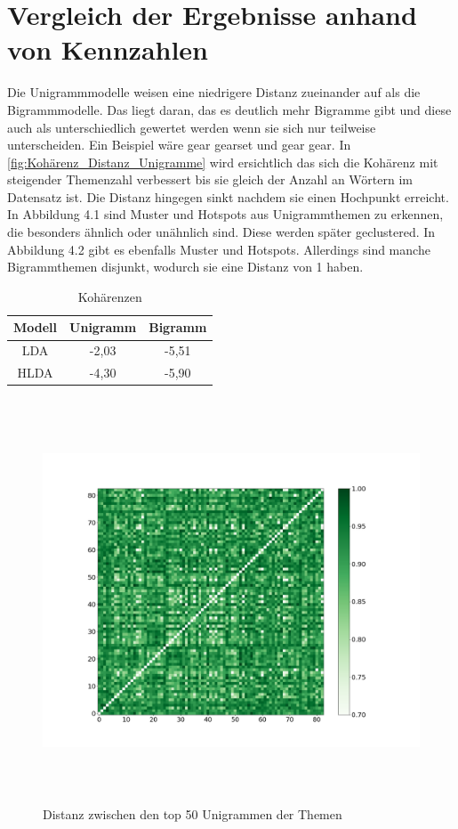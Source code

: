 \section{Vergleich der Ergebnisse anhand von Kennzahlen}
Die Unigrammmodelle weisen eine niedrigere Distanz zueinander auf als die Bigrammmodelle. Das liegt daran, das es deutlich mehr Bigramme gibt und diese auch als unterschiedlich gewertet werden wenn sie sich nur teilweise unterscheiden. Ein Beispiel wäre gear gearset und gear gear. In \ref{fig:Kohärenz_Distanz_Unigramme} wird ersichtlich das sich die Kohärenz mit steigender Themenzahl verbessert bis sie gleich der Anzahl an Wörtern im Datensatz ist. Die Distanz hingegen sinkt nachdem sie einen Hochpunkt erreicht. In Abbildung 4.1 sind Muster und Hotspots aus Unigrammthemen zu erkennen, die besonders ähnlich oder unähnlich sind. Diese werden später geclustered. In Abbildung 4.2 gibt es ebenfalls Muster und Hotspots. Allerdings sind manche Bigrammthemen disjunkt, wodurch sie eine Distanz von 1 haben. 

\begin{table}
	\RawFloats
	\centering
	\caption{Kohärenzen}
	\begin{tabular}{|c|c|c|}
		\hline
		Modell & Unigramm & Bigramm \\
		\hline
		LDA & -2,03 & -5,51 \\
		\hline
		HLDA & -4,30 & -5,90 \\
		\hline
	\end{tabular}
	\label{table:Kohärenzen}
\end{table} 

\begin{figure}[htpb]
	\centering
	\includegraphics[width=\textwidth,height=12cm,keepaspectratio=true]{img/unigram_jaccard_50_green_07.png}
	\caption{
		Distanz zwischen den top 50 Unigrammen der Themen
	}
	\label{fig:Distanz_Unigramme}
\end{figure}

